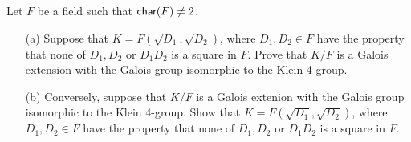\begin{prob}
    Let $F$ be a field such that ${\textsf{char}({F})}\neq 2$.
    \begin{enumerate}
        \item[(a)]
        {
            Suppose that $K=F(\sqrt{D_1}, \sqrt{D_2})$, where $D_1, D_2\in F$ have the property that none of $D_1, D_2$ or $D_1D_2$ is a square in $F$.    
            Prove that $K/F$ is a Galois extension with the Galois group isomorphic to the Klein 4-group.
        }
        \item[(b)]
        {
            Conversely, suppose that $K/F$ is a Galois extenion with the Galois group isomorphic to the Klein 4-group.
            Show that $K=F(\sqrt{D_1}, \sqrt{D_2})$, where $D_1, D_2\in F$ have the property that none of $D_1, D_2$ or $D_1D_2$ is a square in $F$.
        }
    \end{enumerate}
\end{prob}

